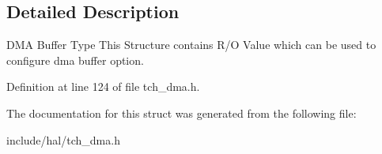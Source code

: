 \subsection{Detailed Description}
D\+M\+A Buffer Type This Structure contains R/\+O Value which can be used to configure dma buffer option. 

Definition at line 124 of file tch\+\_\+dma.\+h.



The documentation for this struct was generated from the following file\+:\begin{DoxyCompactItemize}
\item 
include/hal/tch\+\_\+dma.\+h\end{DoxyCompactItemize}
